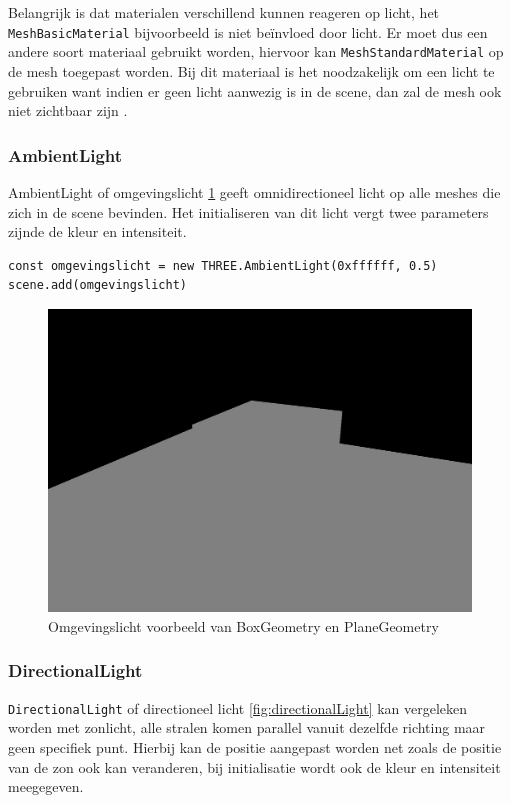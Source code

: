 Belangrijk is dat materialen verschillend kunnen reageren op licht, het \texttt{MeshBasicMaterial} bijvoorbeeld is niet beïnvloed door licht. Er moet dus een andere soort materiaal gebruikt worden, hiervoor kan \texttt{MeshStandardMaterial} op de mesh toegepast worden. Bij dit materiaal is het noodzakelijk om een licht te gebruiken want indien er geen licht aanwezig is in de scene, dan zal de mesh ook niet zichtbaar zijn \autocite{Simon2023}.

\subsubsection{AmbientLight}

AmbientLight of omgevingslicht \ref{fig:ambientLight}  geeft omnidirectioneel licht op alle meshes die zich in de scene bevinden. Het initialiseren van dit licht vergt twee parameters zijnde de kleur en intensiteit.

\begin{lstlisting}
const omgevingslicht = new THREE.AmbientLight(0xffffff, 0.5)
scene.add(omgevingslicht)
\end{lstlisting}

\begin{figure}[h]
	\centering
	\includegraphics[width=.7\linewidth]{graphics/ambientLight}
	\caption[Omgevingslicht voorbeeld van BoxGeometry en PlaneGeometry]{Omgevingslicht voorbeeld van BoxGeometry en PlaneGeometry}
	\label{fig:ambientLight}
\end{figure}

\subsubsection{DirectionalLight}

\texttt{DirectionalLight} of directioneel licht \ref{fig:directionalLight} kan vergeleken worden met zonlicht, alle stralen komen parallel vanuit dezelfde richting maar geen specifiek punt. Hierbij kan de positie aangepast worden net zoals de positie van de zon ook kan veranderen, bij initialisatie wordt ook de kleur en intensiteit meegegeven.

